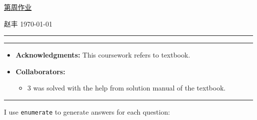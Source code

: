 \documentclass[a4paper]{article}
\begin{document}
\courseheader

\setcounter{hwcnt}{13} %

\begin{center}
  \underline{第\thehwcnt 周作业} \\
\end{center}
\begin{flushleft}
  赵丰\quad \studentID\hfill
  \today
\end{flushleft}
\hrule

\vspace{2em}

\flushleft
\rule{\textwidth}{1pt}
\begin{itemize}
\item {\bf Acknowledgments: \/} 
  This coursework refers to textbook.  
\item {\bf Collaborators: \/}
  \begin{itemize}
  \item 3 was solved with the help from solution manual of the textbook.    
  \end{itemize}
\end{itemize}
\rule{\textwidth}{1pt}

\vspace{2em}

I use \texttt{enumerate} to generate answers for each question:
\end{document}
